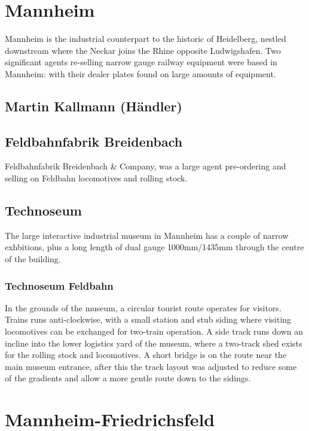 \documentclass[a4paper]{report}
\begin{document}
\section{Mannheim}

Mannheim is the industrial counterpart to the historic of Heidelberg,
nestled downstream where the Neckar joins the Rhine opposite
Ludwigshafen.  Two significant agents re-selling narrow gauge railway
equipment were based in Mannheim: with their dealer plates found on
large amounts of equipment.

\subsection{Martin Kallmann (Händler)}

\subsection{Feldbahnfabrik Breidenbach}

Feldbahnfabrik Breidenbach \& Company, was a large agent pre-ordering
and selling on Feldbahn locomotives and rolling stock.

\subsection{Technoseum}

The large interactive industrial museum in Mannheim has a couple of
narrow exhbitions, plus a long length of dual gauge 1000mm/1435mm through the centre of the building.

\subsubsection{Technoseum Feldbahn}

In the grounds of the museum, a circular tourist route operates for
visitors.  Trains runs anti-clockwise, with a small station and stub
siding where visiting locomotives can be exchanged for two-train
operation.  A side track runs down an incline into the lower logistics
yard of the museum, where a two-track shed exists for the rolling
stock and locomotives.  A short bridge is on the route near the main
museum entrance, after this the track layout was adjusted to reduce
some of the gradients and allow a more gentle route down to the
sidings.

\section{Mannheim-Friedrichsfeld}
\end{document}
